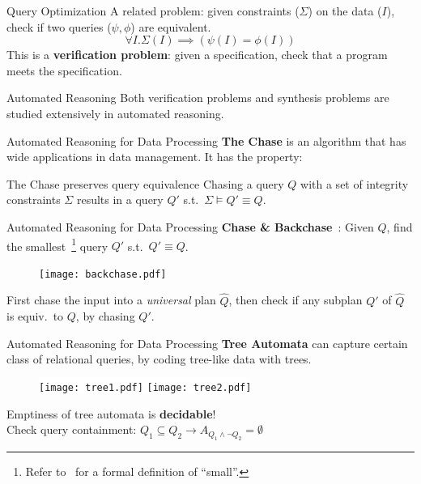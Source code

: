 \documentclass{beamer}
\begin{document}
  \begin{frame}{Query Optimization}
    A related problem: given constraints ($\Sigma$) on the data ($I$), 
    check if two queries ($\psi, \phi$) are equivalent.
    \[\forall I . \Sigma(I) \implies (\psi(I) = \phi(I)) \] \pause
    This is a \textbf{verification problem}:
    given a specification, check that a program meets the specification.
  \end{frame}

  \begin{frame}{Automated Reasoning}
    Both verification problems and synthesis problems are studied 
    extensively in automated reasoning.
  \end{frame}

  \begin{frame}{Automated Reasoning for Data Processing}
    \textbf{The Chase} is an algorithm that has wide applications 
    in data management. It has the property:
    \begin{alertblock}{The Chase preserves query equivalence}
      Chasing a query $Q$ with a set of integrity constraints $\Sigma$
      results in a query $Q'$ s.t.~$\Sigma \models Q'\equiv Q$.
    \end{alertblock}
  \end{frame}

  \begin{frame}{Automated Reasoning for Data Processing}
    \textbf{Chase \& Backchase}~\cite{backchase}: Given $Q$, find the smallest~\footnote{
      Refer to~\cite{backchase} for a formal definition of ``small''.
    }
    query $Q'$ s.t.~$Q'\equiv Q$.
    \begin{figure}
      \texttt{[image: backchase.pdf]}
    \end{figure}
    First chase the input into a {\em universal} plan $\hat Q$, \pause 
    then check if any subplan $Q'$ of $\hat Q$ is equiv.~to $Q$,
    by chasing $Q'$.
  \end{frame}

  \begin{frame}{Automated Reasoning for Data Processing}
    \textbf{Tree Automata} can capture certain class of
    relational queries, by coding tree-like data with trees.
    \begin{figure}
      \colorbox{white}{
      \texttt{[image: tree1.pdf]}
      \hspace{1cm}
      \texttt{[image: tree2.pdf]}}
    \end{figure}
    \pause
    Emptiness of tree automata is \textbf{decidable}! \\
    Check query containment: 
    $Q_1 \subseteq Q_2 \rightarrow A_{Q_1 \wedge \neg Q_2} = \emptyset$
  \end{frame}
\end{document}
